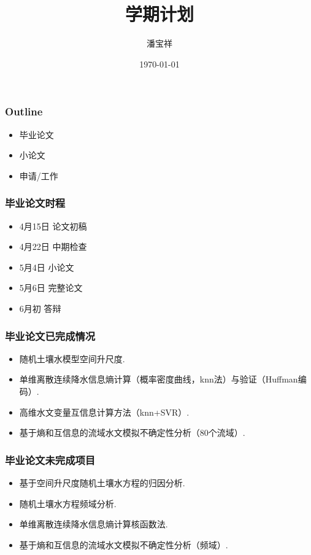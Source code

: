 \documentclass{beamer}
\begin{document}
\begin{CJK}{UTF8}{gkai}
\title{学期计划}
\date{\today}
\author{潘宝祥}
\maketitle

\begin{frame}
\frametitle{Outline}
\begin{itemize}
\item 毕业论文
\item 小论文
\item 申请/工作
\end{itemize}
\end{frame}



\begin{frame}
\frametitle{毕业论文时程}
\begin{itemize}
\item 4月15日  论文初稿
\item 4月22日  中期检查
\item 5月4日   小论文 
\item 5月6日   完整论文
\item 6月初    答辩
\end{itemize}
\end{frame}

\begin{frame}
\frametitle{毕业论文已完成情况}
\begin{itemize}
\item 随机土壤水模型空间升尺度.
\item 单维离散连续降水信息熵计算（概率密度曲线，knn法）与验证（Huffman编码）.
\item 高维水文变量互信息计算方法（knn+SVR）.
\item 基于熵和互信息的流域水文模拟不确定性分析（80个流域）.
\end{itemize}
\end{frame}

\begin{frame}
\frametitle{毕业论文未完成项目}
\begin{itemize}
\item 基于空间升尺度随机土壤水方程的归因分析.
\item 随机土壤水方程频域分析. 
\item 单维离散连续降水信息熵计算核函数法.
\item 基于熵和互信息的流域水文模拟不确定性分析（频域）.
\end{itemize}
\end{frame}


\end{CJK}
\end{document}

